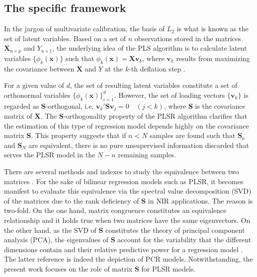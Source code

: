 \documentclass[journal=ancham,manuscript=article]{achemso}
\begin{document}
\subsection{The specific framework}

In the jargon of multivariate calibration, the basis of $L_2$ is what is known as the set of latent variables. Based on a set of $n$ observations stored in the matrices $\mathbf{X}_{n\times p}$ and $Y_{n\times 1}$, the underlying idea of the PLS algorithm is to calculate latent variables $\{\phi_{k}(\mathbf{x})\}$ such that $\phi_k(\mathbf{x}) = \mathbf{Xv}_{k}$, where $\mathbf{v}_k$ results from maximizing the covariance between $\mathbf{X}$ and $Y$ at the $k$-th deflation step \cite{DeJong1993}. 

For a given value of $d$, the set of resulting latent variables constitute a set of orthonormal variables $\{\phi_{k}(\mathbf{x})\}_{i=1}^d$. However, the set of loading vectors $\{\mathbf{v}_k\}$ is regarded as $\mathbf{S}$-orthogonal, i.e. $\mathbf{v}_k'\mathbf{S}\mathbf{v}_j = 0 \quad (j<k)$, where $\mathbf{S}$ is the covariance matrix of $\mathbf{X}$. The $\mathbf{S}$-orthogonality property of the PLSR algorithm clarifies that the estimation of this type of regression model depends highly on the covariance matrix $\mathbf{S}$. This property suggests that if $n<N$ samples are found such that $\mathbf{S}_n$ and $\mathbf{S}_N$ are equivalent, there is no pure unsupervised information discarded that serves the PLSR model in the $N-n$ remaining samples.

There are several methods and indexes to study the equivalence between two matrices \cite{Tomic2013}. For the sake of bilinear regression models such as PLSR, it becomes manifest to evaluate this equivalence via the spectral value decomposition (SVD) of the matrices due to the rank deficiency of $\mathbf{S}$ in NIR applications. The reason is two-fold. On the one hand, matrix congruence constitutes an equivalence relationship and it holds true when two matrices have the same eigenvectors\cite{Horn1985}. On the other hand, as the SVD of $\mathbf{S}$ constitutes the theory of principal component analysis (PCA), the eigenvalues of $\mathbf{S}$ account for the variability that the different dimensions contain and their relative predictive power for a regression model \cite{Artemiou2013}. The latter reference is indeed the depiction of PCR models. Notwithstanding, the present work focuses on the role of matrix $\mathbf{S}$ for PLSR models.

\end{document}
